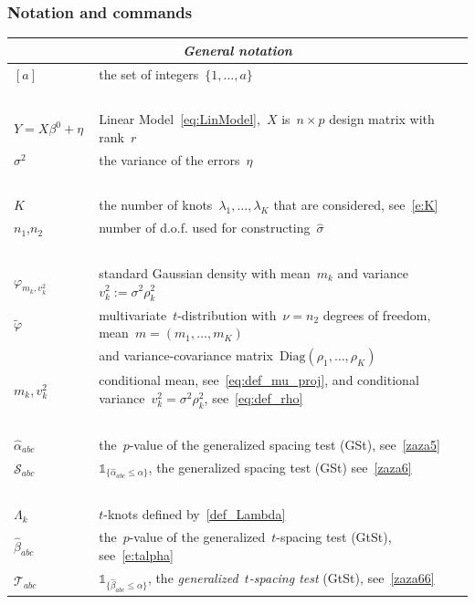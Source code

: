 \documentclass[final,numbib]{imaiai}%
\numberwithin{equation}{section}
\def\cS{\mathcal{S}}
\def\cT{\mathcal{T}}
\renewcommand{\hat}{\widehat}
\renewcommand{\tilde}{\widetilde}
\def\\bUnif{\text{\bUnif}}
\newcommand{\<}{\langle}
\renewcommand{\>}{\rangle}
\newcommand{\1}{\mathds{1}}
\begin{document}
{{\subsubsection{Notation and commands}  
\label{table:mr}
\vspace*{0.3cm}

\begin{center}
	{\small
	\begin{tabular}{ll}
		\multicolumn{2}{c}{\textit{General notation}} \\
		\midrule
		$[a]$ 
		& the set of integers~$\{1,...,a\}$ \\
		{\ } & {\ }\\
		$ Y = X \beta^0 + \eta~$ 
		&  Linear Model~\eqref{eq:LinModel},~$X$  is~$n\times p$ design matrix with rank~$r$ \\
		$\sigma^2$ 
		& the variance of the errors~$\eta$ \\
		{\ } & {\ }\\
		$K$ 
		&  the number of knots~$\lambda_1,\ldots,\lambda_K$ that are considered, see~\eqref{e:K} \\
		$n_1$,$n_2$ 
		& number of d.o.f.
used for constructing~$  \hat \sigma$ \\
		{\ } & {\ }\\
		$\varphi_{m_k, v^2_k}~$  &standard Gaussian density with mean~$m_k$ and variance~$v_k^2:=\sigma^2\rho_k^2$\\ 
		$\tilde\varphi$
		& multivariate~$t$-distribution with~$\nu=n_2$ degrees of freedom, mean~$m=(m_1,\ldots,m_K)$\\
		& and variance-covariance matrix~$\mathrm{Diag}(\rho_1,\ldots,\rho_K)$\\
		$m_k,v_k^2$ 
		& conditional mean, see~\eqref{eq:def_mu_proj}, and conditional variance~$v^2_k=\sigma^2\rho_k^2$, see~\eqref{eq:def_rho}\\
		{\ } & {\ }\\
		$ \hat \alpha_{abc}$ 
		& the~$p$-value  of the generalized spacing test (GSt), see~\eqref{zaza5}\\
		$ \cS_{abc}$ 
		& $\mathds1_{\{\hat\alpha_{abc}\leq\alpha\}}$, the generalized spacing test (GSt) see~\eqref{zaza6} \\
		{\ } & {\ }\\
		$\Lambda_k$
		& $t$-knots defined by~\eqref{def_Lambda}\\
		$\hat\beta_{abc}$
		& the~$p$-value of the generalized~$t$-spacing test (GtSt), see~\eqref{e:talpha}\\
		$ \cT_{abc}$ 
		& $\mathds1_{\{\hat\beta_{abc}\leq\alpha\}}$, the {\it generalized~$t$-spacing test} (GtSt), see~\eqref{zaza66} 
	\end{tabular}}
\end{center}

}}
\end{document}
